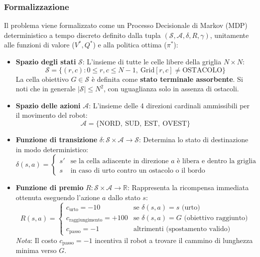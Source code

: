 \clearpage
\subsubsection{Formalizzazione}
Il problema viene formalizzato come un Processo Decisionale di Markov (MDP) deterministico a tempo discreto definito dalla tupla $(\mathcal{S}, \mathcal{A}, \delta, R, \gamma)$, unitamente alle funzioni di valore ($V^*, Q^*$) e alla politica ottima ($\pi^*$):

\begin{itemize}
    \item \textbf{Spazio degli stati} $\mathcal{S}$:
    L'insieme di tutte le celle libere della griglia $N \times N$:
    \[
    \mathcal{S} = \{(r,c) : 0 \le r,c \le N-1,\ \text{Grid}[r,c] \ne \text{OSTACOLO}\}
    \]
    La cella obiettivo $G \in \mathcal{S}$ è definita come \textbf{stato terminale assorbente}. Si noti che in generale $|\mathcal{S}| \le N^2$, con uguaglianza solo in assenza di ostacoli.

    \item \textbf{Spazio delle azioni} $\mathcal{A}$:
    L'insieme delle 4 direzioni cardinali ammissibili per il movimento del robot:
    \[
    \mathcal{A} = \{\text{NORD},\ \text{SUD},\ \text{EST},\ \text{OVEST}\}
    \]

    \item \textbf{Funzione di transizione} $\delta : \mathcal{S} \times \mathcal{A} \to \mathcal{S}$:
    Determina lo stato di destinazione in modo deterministico:
    \[
    \delta(s,a) = \begin{cases}
    s' & \text{se la cella adiacente in direzione } a \text{ è libera e dentro la griglia} \\
    s & \text{in caso di urto contro un ostacolo o il bordo}
    \end{cases}
    \]

    \item \textbf{Funzione di premio} $R : \mathcal{S} \times \mathcal{A} \to \mathbb{R}$:
    Rappresenta la ricompensa immediata ottenuta eseguendo l'azione $a$ dallo stato $s$:
    \[
    R(s,a) = \begin{cases}
    c_{\text{urto}} = -10 & \text{se } \delta(s,a) = s \text{ (urto)} \\
    c_{\text{raggiungimento}} = +100 & \text{se } \delta(s,a) = G \text{ (obiettivo raggiunto)} \\
    c_{\text{passo}} = -1 & \text{altrimenti (spostamento valido)}
    \end{cases}
    \]
    \textit{Nota}: Il costo $c_{\text{passo}} = -1$ incentiva il robot a trovare il cammino di lunghezza minima verso $G$.


\end{itemize}
